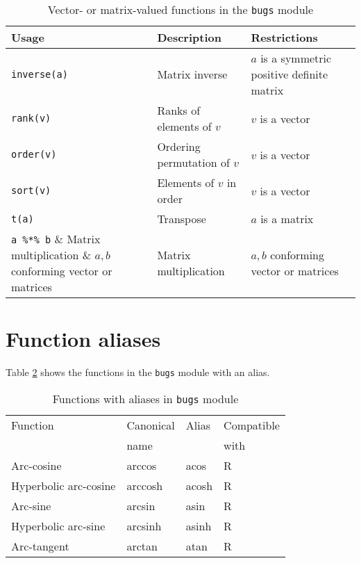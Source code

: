 \documentclass[11pt, a4paper, titlepage]{report}
\begin{document}
\begin{table}
\begin{center}
\begin{tabular}{lll}
\hline
Usage & Description & Restrictions \\
\hline
\verb+inverse(a)+ & Matrix inverse & $a$ is a symmetric positive definite matrix  \\
\verb+rank(v)+ & Ranks of elements of $v$ & $v$ is a vector   \\
\verb+order(v)+ & Ordering permutation of $v$ & $v$ is a vector \\
\verb+sort(v)+ & Elements of $v$ in order & $v$ is a vector  \\
\verb+t(a)+    & Transpose                & $a$ is a matrix \\
\verb+a %*% b+  & Matrix multiplication & $a,b$ conforming vector or matrices\\

\hline
\end{tabular}
\caption{Vector- or matrix-valued functions in the \texttt{bugs}
  module \label{table:bugs:vector}}
\end{center}
\end{table}

\section{Function aliases}

Table \ref{table:bugs:functions:alias} shows the
functions in the \texttt{bugs} module with an alias.

\begin{table}
\begin{center}
\begin{tabular}{llll}
\hline
Function               & Canonical & Alias & Compatible  \\
                       & name      &       & with         \\
\hline
Arc-cosine             & arccos    & acos  & R \\
Hyperbolic arc-cosine  & arccosh   & acosh & R \\
Arc-sine               & arcsin    & asin  & R \\
Hyperbolic arc-sine    & arcsinh   & asinh & R \\
Arc-tangent            & arctan    & atan  & R \\
\hline
\end{tabular}
\caption{Functions with aliases in \texttt{bugs} module
  \label{table:bugs:functions:alias}}
\end{center}
\end{table}
\end{document}

